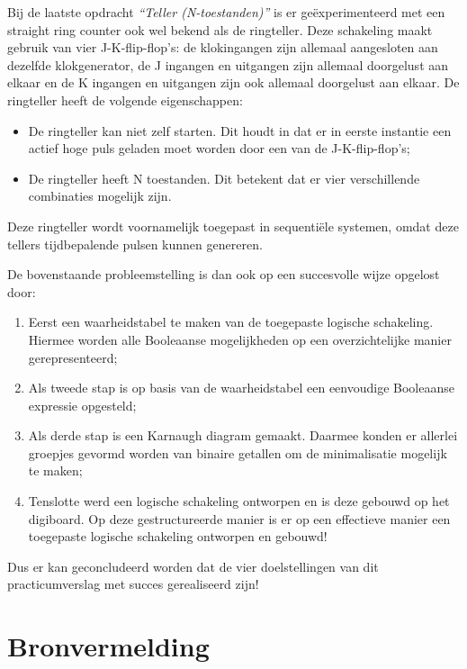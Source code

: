 \documentclass[12pt]{article}
\begin{document}
Bij de laatste opdracht \textit{``Teller (N-toestanden)''} is er geëxperimenteerd met een straight ring counter ook wel bekend als de ringteller. 
Deze schakeling maakt gebruik van vier J-K-flip-flop's: de klokingangen zijn allemaal aangesloten aan dezelfde klokgenerator, de J ingangen en uitgangen zijn allemaal doorgelust aan elkaar en de K ingangen en uitgangen zijn ook allemaal doorgelust aan elkaar. 
De ringteller heeft de volgende eigenschappen:
\begin{itemize}
    \item De ringteller kan niet zelf starten. Dit houdt in dat er in eerste instantie een actief hoge puls geladen moet worden door een van de J-K-flip-flop's;
    \item De ringteller heeft N toestanden. Dit betekent dat er vier verschillende combinaties mogelijk zijn.
\end{itemize}
Deze ringteller wordt voornamelijk toegepast in sequentiële systemen, omdat deze tellers tijdbepalende pulsen kunnen genereren. 



De bovenstaande probleemstelling is dan ook op een succesvolle wijze opgelost door:
\begin{enumerate}
    \item Eerst een waarheidstabel te maken van de toegepaste logische schakeling. Hiermee worden alle Booleaanse mogelijkheden op een overzichtelijke manier gerepresenteerd;
    \item Als tweede stap is op basis van de waarheidstabel een eenvoudige Booleaanse expressie opgesteld;
    \item Als derde stap is een Karnaugh diagram gemaakt. Daarmee konden er allerlei groepjes gevormd worden van binaire getallen om de minimalisatie mogelijk te maken;
    \item Tenslotte werd een logische schakeling ontworpen en is deze gebouwd op het digiboard. Op deze gestructureerde manier is er op een effectieve manier een toegepaste logische schakeling ontworpen en gebouwd!
\end{enumerate}
Dus er kan geconcludeerd worden dat de vier doelstellingen van dit practicumverslag met succes gerealiseerd zijn!
\pagebreak






\nocite{*}
\section{Bronvermelding}




\pagebreak
\end{document}
